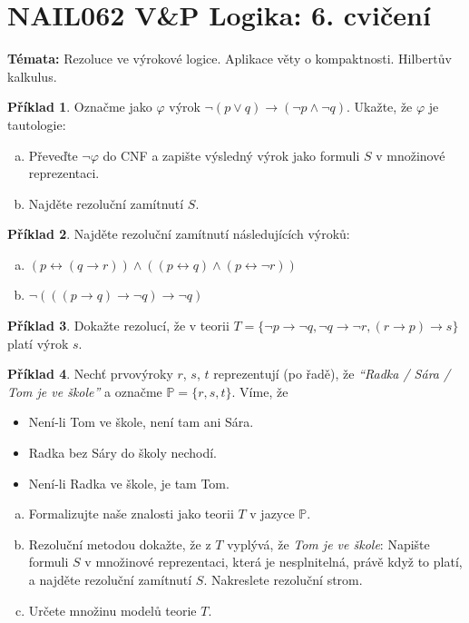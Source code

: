 \documentclass[a4paper]{article}
\theoremstyle{definition}
\newtheorem{problem}{Příklad}
\begin{document}
\section*{NAIL062 V\&P Logika: 6. cvičení}


\textbf{Témata:} 
Rezoluce ve výrokové logice. Aplikace věty o kompaktnosti. Hilbertův kalkulus.


\medskip\begin{problem}
Označme jako $\varphi$ výrok $\neg (p \vee q) \to (\neg p \wedge \neg q)$. Ukažte, že $\varphi$ je tautologie:
\begin{enumerate}[(a)]
    \item Převeďte $\neg \varphi$ do CNF a zapište výsledný výrok jako formuli $S$ v množinové reprezentaci.
    \item Najděte rezoluční zamítnutí $S$.
\end{enumerate}
\end{problem}


\medskip\begin{problem}
Najděte rezoluční zamítnutí následujících výroků:
\begin{enumerate}[(a)]
    \item $(p\leftrightarrow (q\to r))\wedge((p\leftrightarrow q)\wedge(p\leftrightarrow \neg r))$
    \item $\neg(((p\to q)\to \neg q)\to \neg q)$
\end{enumerate}
\end{problem}
    
    
\medskip\begin{problem}
Dokažte rezolucí, že v teorii $T=\{\neg p \to \neg q,\neg q \to \neg r, (r\to p)\to s\}$ platí výrok $s$.
\end{problem}


\medskip\begin{problem}Nechť prvovýroky $r$, $s$, $t$  reprezentují (po řadě), že \emph{``Radka / Sára / Tom je ve škole''} a označme $\mathbb{P}=\{r,s,t\}$. Víme, že
    \begin{itemize}
    \item Není-li Tom ve škole, není tam ani Sára.
    \item Radka bez Sáry do školy nechodí.
    \item Není-li Radka ve škole, je tam Tom.
    \end{itemize}
    \begin{enumerate}[(a)]
    \item Formalizujte naše znalosti jako teorii $T$ v jazyce $\mathbb P$.
    \item Rezoluční metodou dokažte, že z $T$ vyplývá, že \emph{Tom je ve škole}: Napište formuli $S$ v množinové reprezentaci, která je nesplnitelná, právě když to platí, a najděte rezoluční zamítnutí $S$. Nakreslete rezoluční strom.
    \item Určete množinu modelů teorie $T$.
    \end{enumerate}
\end{problem}
\end{document}
